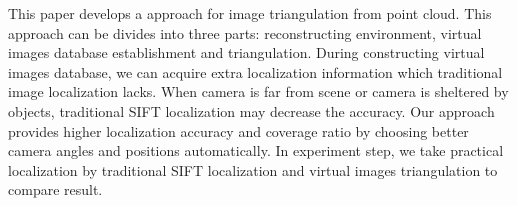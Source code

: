 
This paper develops a approach for image triangulation from point cloud. This approach can
be divides into three parts: reconstructing environment, virtual images database establishment and triangulation. During constructing virtual images database, we can acquire extra localization 
information which traditional image localization lacks. When camera is far from scene or camera 
is sheltered by objects, traditional SIFT localization may decrease the accuracy. Our approach 
provides higher localization accuracy and coverage ratio by choosing better camera angles and 
positions automatically. In experiment step, we take practical localization by traditional SIFT 
localization and virtual images triangulation to compare result. 



